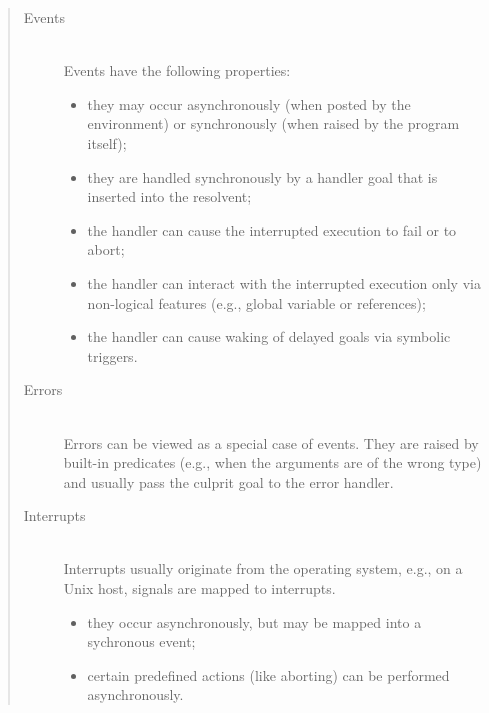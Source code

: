 \begin{quote}
\begin{description}
\item[Events]\mbox{}\\
  Events have the following properties:
    \begin{itemize}
    \item they may occur asynchronously (when posted by the environment)
        or synchronously (when raised by the program itself);
    \item they are handled synchronously by a handler goal that is inserted
        into the resolvent;
    \item the handler can cause the interrupted execution to fail or to abort;
    \item the handler can interact with the interrupted execution only via
        non-logical features (e.g., global variable or references);
    \item the handler can cause waking of delayed goals via symbolic triggers.
    \end{itemize}

\item[Errors]\mbox{}\\
    Errors can be viewed as a special case of events. They are raised by
    built-in predicates (e.g., when the arguments are of the wrong type)
    and usually pass the culprit goal to the error handler.

\item[Interrupts]\mbox{}\\
    Interrupts usually originate from the operating system, e.g., on a Unix
    host, signals are mapped to {\eclipse} interrupts.
    \begin{itemize}
    \item they occur asynchronously, but may be mapped into a sychronous event;
    \item certain predefined actions (like aborting) can be performed
        asynchronously.
    \end{itemize}
\end{description}
\end{quote}


